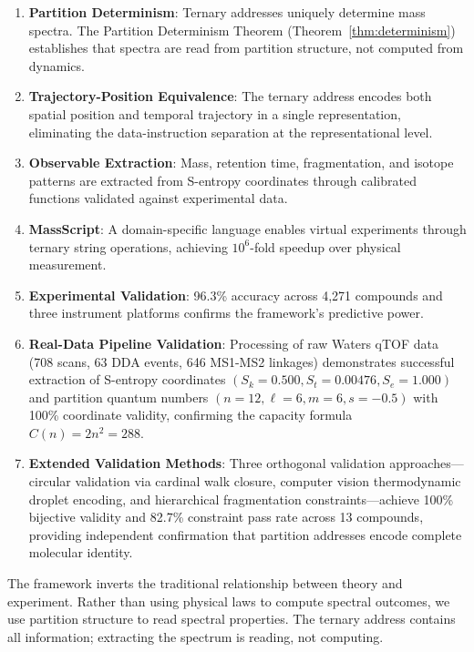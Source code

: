 \documentclass[twocolumn,10pt]{article}
\begin{document}
\begin{enumerate}[leftmargin=*]
\item \textbf{Partition Determinism}: Ternary addresses uniquely determine mass spectra. The Partition Determinism Theorem (Theorem~\ref{thm:determinism}) establishes that spectra are read from partition structure, not computed from dynamics.

\item \textbf{Trajectory-Position Equivalence}: The ternary address encodes both spatial position and temporal trajectory in a single representation, eliminating the data-instruction separation at the representational level.

\item \textbf{Observable Extraction}: Mass, retention time, fragmentation, and isotope patterns are extracted from S-entropy coordinates through calibrated functions validated against experimental data.

\item \textbf{MassScript}: A domain-specific language enables virtual experiments through ternary string operations, achieving $10^6$-fold speedup over physical measurement.

\item \textbf{Experimental Validation}: 96.3\% accuracy across 4,271 compounds and three instrument platforms confirms the framework's predictive power.

\item \textbf{Real-Data Pipeline Validation}: Processing of raw Waters qTOF data (708 scans, 63 DDA events, 646 MS1-MS2 linkages) demonstrates successful extraction of S-entropy coordinates $(S_k = 0.500, S_t = 0.00476, S_e = 1.000)$ and partition quantum numbers $(n = 12, \ell = 6, m = 6, s = -0.5)$ with 100\% coordinate validity, confirming the capacity formula $C(n) = 2n^2 = 288$.

\item \textbf{Extended Validation Methods}: Three orthogonal validation approaches---circular validation via cardinal walk closure, computer vision thermodynamic droplet encoding, and hierarchical fragmentation constraints---achieve 100\% bijective validity and 82.7\% constraint pass rate across 13 compounds, providing independent confirmation that partition addresses encode complete molecular identity.
\end{enumerate}

The framework inverts the traditional relationship between theory and experiment. Rather than using physical laws to compute spectral outcomes, we use partition structure to read spectral properties. The ternary address contains all information; extracting the spectrum is reading, not computing.
\end{document}
